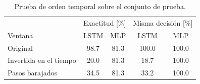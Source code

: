 \begin{table}[t]
\centering
\caption{Prueba de orden temporal sobre el conjunto de prueba.}
\label{tab:orden}
\scriptsize
\begin{tabular}{lcccc}
\toprule
 & \multicolumn{2}{c}{Exactitud [\%]} & \multicolumn{2}{c}{Misma decisión [\%]} \\
Ventana & LSTM & MLP & LSTM & MLP \\
\midrule
Original & 98.7 & 81.3 & 100.0 & 100.0 \\
Invertida en el tiempo & 20.0 & 81.3 & 18.7 & 100.0 \\
Pasos barajados & 34.5 & 81.3 & 33.2 & 100.0 \\
\bottomrule
\end{tabular}
\end{table}

